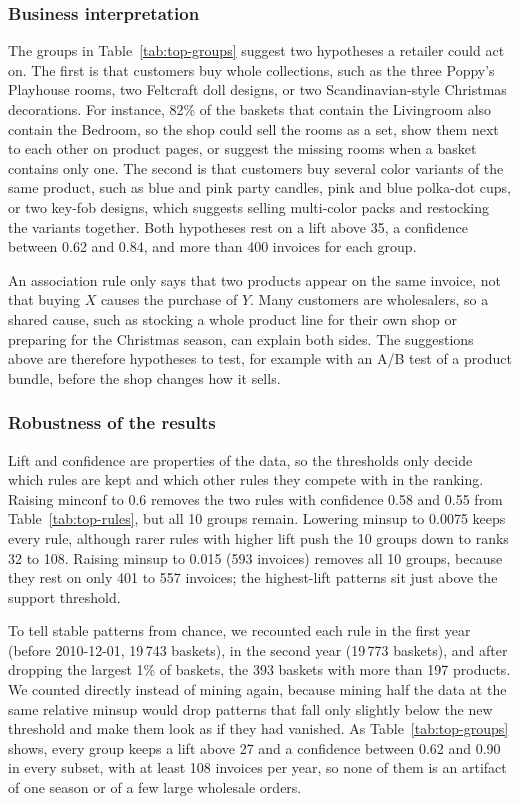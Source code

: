 \subsubsection{Business interpretation}
The groups in Table~\ref{tab:top-groups} suggest two hypotheses a retailer could act on.
The first is that customers buy whole collections, such as the three Poppy's Playhouse
rooms, two Feltcraft doll designs, or two Scandinavian-style Christmas decorations. For
instance, 82\% of the baskets that contain the Livingroom also contain the Bedroom, so the
shop could sell the rooms as a set, show them next to each other on product pages, or
suggest the missing rooms when a basket contains only one. The second is that customers
buy several color variants of the same product, such as blue and pink party candles, pink
and blue polka-dot cups, or two key-fob designs, which suggests selling multi-color packs
and restocking the variants together. Both hypotheses rest on a lift above 35, a
confidence between 0.62 and 0.84, and more than 400 invoices for each group.

An association rule only says that two products appear on the same invoice, not that
buying $X$ causes the purchase of $Y$. Many customers are wholesalers, so a shared cause,
such as stocking a whole product line for their own shop or preparing for the Christmas
season, can explain both sides. The suggestions above are therefore hypotheses to test,
for example with an A/B test of a product bundle, before the shop changes how it sells.

\subsubsection{Robustness of the results}
Lift and confidence are properties of the data, so the thresholds only decide which rules
are kept and which other rules they compete with in the ranking. Raising minconf to 0.6
removes the two rules with confidence 0.58 and 0.55 from Table~\ref{tab:top-rules}, but
all 10 groups remain. Lowering minsup to 0.0075 keeps every rule, although rarer rules
with higher lift push the 10 groups down to ranks 32 to 108. Raising minsup to 0.015 (593
invoices) removes all 10 groups, because they rest on only 401 to 557 invoices; the
highest-lift patterns sit just above the support threshold.

To tell stable patterns from chance, we recounted each rule in the first year (before
2010-12-01, 19\,743 baskets), in the second year (19\,773 baskets), and after dropping the
largest 1\% of baskets, the 393 baskets with more than 197 products. We counted directly
instead of mining again, because mining half the data at the same relative minsup would
drop patterns that fall only slightly below the new threshold and make them look as if
they had vanished. As Table~\ref{tab:top-groups} shows, every group keeps a lift above 27
and a confidence between 0.62 and 0.90 in every subset, with at least 108 invoices per
year, so none of them is an artifact of one season or of a few large wholesale orders.

